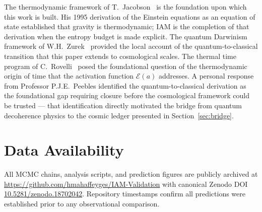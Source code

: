 \documentclass[12pt,a4paper]{article}
\begin{document}
The thermodynamic framework of T.\ Jacobson~\citep{Jacobson1995} is the
foundation upon which this work is built. His 1995 derivation of the
Einstein equations as an equation of state established that gravity is
thermodynamic; IAM is the completion of that derivation when the entropy
budget is made explicit. The quantum Darwinism framework of
W.H.\ Zurek~\citep{Zurek2003,Zurek2009} provided the local account of
the quantum-to-classical transition that this paper extends to
cosmological scales. The thermal time program of C.\
Rovelli~\citep{Connes1994} posed the foundational question of the
thermodynamic origin of time that the activation function
$\mathcal{E}(a)$ addresses. A personal response from
Professor P.J.E.\ Peebles identified the quantum-to-classical derivation
as the foundational gap requiring closure before the cosmological
framework could be trusted --- that identification directly motivated the
bridge from quantum decoherence physics to the cosmic ledger presented
in Section~\ref{sec:bridge}.

\section*{Data Availability}

All MCMC chains, analysis scripts, and prediction figures are publicly
archived at \url{https://github.com/hmahaffeyges/IAM-Validation} with
canonical Zenodo DOI
\href{https://doi.org/10.5281/zenodo.18702042}{10.5281/zenodo.18702042}.
Repository timestamps confirm all predictions were established prior to
any observational comparison.



\end{document}
